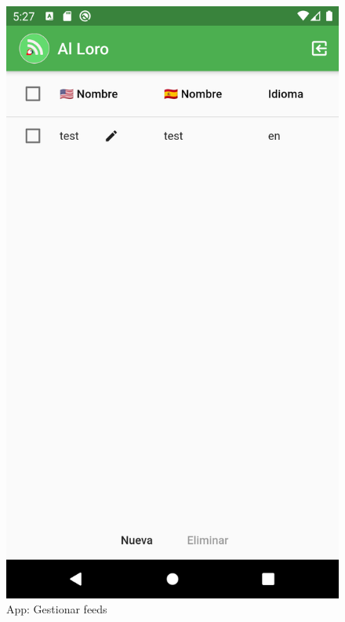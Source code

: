 \documentclass[11pt,spanish,listoffigures,listoftables,table,hyphens,dvipsnames]{tfgetsinf}
\begin{document}
\begin{figure}[ht]
   \centering
   \includegraphics[width=.9\textwidth]{app-gestion-feeds.png}
   \caption{App: Gestionar feeds}
   \label{figura:app-gestion-feeds}
\end{figure}
\end{document}
